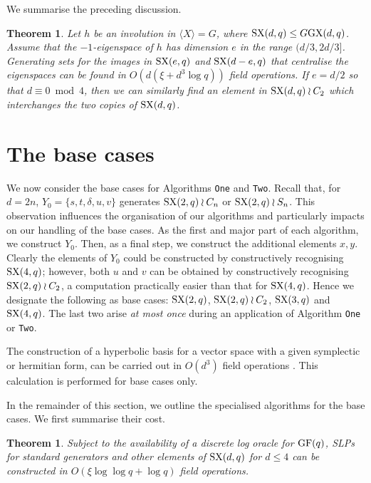 \documentclass[12pt]{article}
\newtheorem{theorem}[definition]{Theorem}
\def\GF{{\rm GF}}
\def\SX{{\rm SX}}
\def\GX{{\rm GX}}
\begin{document}
We summarise the preceding discussion. 
\begin{theorem}
Let $h$ be an involution in $\langle X \rangle = G$, where
$\SX(d, q) \leq G \GX(d, q)$. Assume that the 
$-1$-eigenspace of $h$ has dimension $e$ in the range $(d/3, 2d/3]$.
Generating sets for the images in 
$\SX(e, q)$ and $\SX(d - e, q)$ that centralise
the eigenspaces can be found in $O(d(\xi + d^3 \log q))$ field operations.
If $e = d/2$ so that $d \equiv 0 \bmod 4$, then
we can similarly find an element in $\SX(d, q) \wr C_2$ which
interchanges the two copies of $\SX(d, q)$.
\end{theorem}

\section{The base cases}
\label{base}
We now consider the base cases for 
Algorithms {\tt One} and {\tt Two}.
Recall that, for $d = 2n$, 
$Y_0 = \{ s, t, \delta, u, v \}$
generates $\SX(2, q) \wr C_n$  or $\SX(2, q) \wr S_n$.
This observation influences the organisation of our 
algorithms and particularly impacts on our handling of the base cases. 
As the first and major part of each
algorithm, we construct $Y_0$.   
Then, as a final step, we construct the 
additional elements $x, y$.
Clearly the elements of $Y_0$ could be constructed
by constructively recognising $\SX(4, q)$; however, both $u$ and $v$
can be obtained by constructively recognising $\SX(2, q) \wr C_2$, a 
computation practically easier than that for $\SX(4, q)$.
Hence we designate the following as 
base cases: $\SX(2, q)$, $\SX(2, q) \wr C_2$, $\SX(3, q)$ and $\SX(4, q)$. 
The last two arise {\it at most once} during
an application of Algorithm {\tt One} or {\tt Two}.

The construction of a hyperbolic basis for a vector space with a given
symplectic or hermitian form, can be carried out
in $O(d^3)$ field operations \cite[Chapter 2]{Grove02}.
This calculation is performed for base cases only.

In the remainder of this section, 
we outline the specialised algorithms
for the base cases. 
We first summarise their cost.

\begin{theorem}\label{ryba-alg}
Subject to the availability of a discrete log oracle 
for $\GF(q)$, {\rm SLPs} for standard generators and other 
elements of $\SX(d, q)$ for $d \leq 4$ can be 
constructed in $O(\xi \log \log q + \log q)$ field operations.
\end{theorem}
\end{document}
